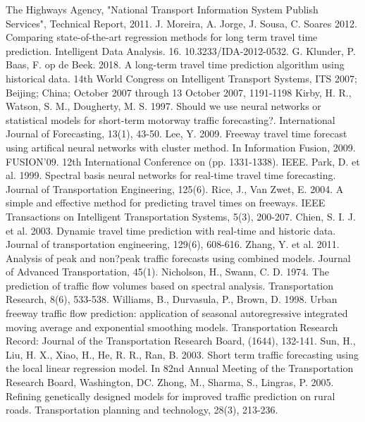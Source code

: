 \documentclass[letterpaper, 10 pt, conference]{ieeeconf}  %
\begin{document}
\begin{thebibliography}{00}
 The Highways Agency, "National Transport Information System Publish Services", Technical Report, 2011. 
 J. Moreira, A. Jorge, J. Sousa, C. Soares 2012. Comparing state-of-the-art regression methods for long term travel time prediction. Intelligent Data Analysis. 16. 10.3233/IDA-2012-0532. 
 G. Klunder, P. Baas, F. op de Beek. 2018. A long-term travel time prediction algorithm using historical data. 14th World Congress on Intelligent Transport Systems, ITS 2007; Beijing; China; October 2007 through 13 October 2007, 1191-1198
 Kirby, H. R., Watson, S. M., Dougherty, M. S. 1997. Should we use neural networks or statistical models for short-term motorway traffic forecasting?. International Journal of Forecasting, 13(1), 43-50.
 Lee, Y. 2009. Freeway travel time forecast using artifical neural networks with cluster method. In Information Fusion, 2009. FUSION'09. 12th International Conference on (pp. 1331-1338). IEEE.
 Park, D. et al. 1999. Spectral basis neural networks for real-time travel time forecasting. Journal of Transportation Engineering, 125(6).
 Rice, J., Van Zwet, E. 2004. A simple and effective method for predicting travel times on freeways. IEEE Transactions on Intelligent Transportation Systems, 5(3), 200-207.
 Chien, S. I. J. et al. 2003. Dynamic travel time prediction with real-time and historic data. Journal of transportation engineering, 129(6), 608-616.
 Zhang, Y. et al. 2011. Analysis of peak and non?peak traffic forecasts using combined models. Journal of Advanced Transportation, 45(1).
 Nicholson, H., Swann, C. D. 1974. The prediction of traffic flow volumes based on spectral analysis. Transportation Research, 8(6), 533-538.
 Williams, B., Durvasula, P., Brown, D. 1998. Urban freeway traffic flow prediction: application of seasonal autoregressive integrated moving average and exponential smoothing models. Transportation Research Record: Journal of the Transportation Research Board, (1644), 132-141.
 Sun, H., Liu, H. X., Xiao, H., He, R. R., Ran, B. 2003. Short term traffic forecasting using the local linear regression model. In 82nd Annual Meeting of the Transportation Research Board, Washington, DC.
 Zhong, M., Sharma, S., Lingras, P. 2005. Refining genetically designed models for improved traffic prediction on rural roads. Transportation planning and technology, 28(3), 213-236.

\end{thebibliography}
\end{document}
